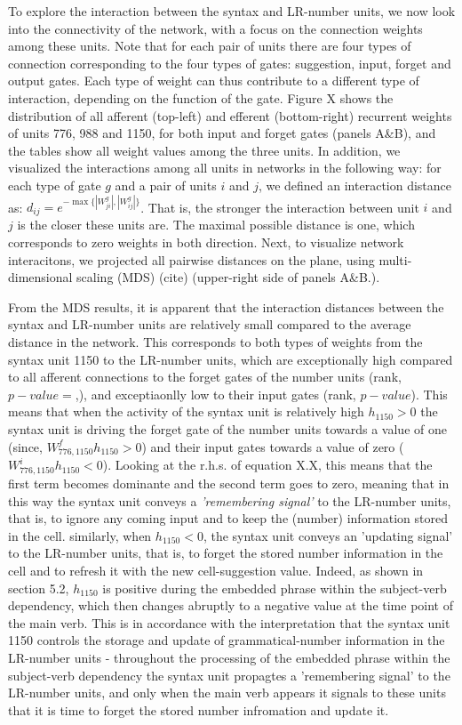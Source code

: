 To explore the interaction between the syntax and LR-number units, we now look into the connectivity of the network, with a focus on the connection weights among these units. Note that for each pair of units there are four types of connection corresponding to the four types of gates: suggestion, input, forget and output gates. Each type of weight can thus contribute to a different type of interaction, depending on the function of the gate. Figure X shows the distribution of all afferent (top-left) and efferent (bottom-right) recurrent weights of units 776, 988 and 1150, for both input and forget gates (panels A\&B), and the tables show all weight values among the three units. In addition, we visualized the interactions among all units in networks in the following way: for each type of gate $g$ and a pair of units $i$ and $j$, we defined an interaction distance as: $d_{ij}=e^{-\max{\{|W_{ji}^{g}|, |W_{ij}^{g}|\}}}$. That is, the stronger the interaction between unit $i$ and $j$ is the closer these units are. The maximal possible distance is one, which corresponds to zero weights in both direction. Next, to visualize network interacitons, we projected all pairwise distances on the plane, using multi-dimensional scaling (MDS) (cite) (upper-right side of panels A\&B.).

From the MDS results, it is apparent that the interaction distances between the syntax and LR-number units are relatively small compared to the average distance in the network. This corresponds to both types of weights from the syntax unit 1150 to the LR-number units, which are exceptionally high compared to all afferent connections to the forget gates of the number units (rank, $p-value=$,), and exceptiaonlly low to their input gates (rank, $p-value$). This means that when the activity of the syntax unit is relatively high $h_1150 > 0$ the syntax unit is driving the forget gate of the number units towards a value of one (since, $W^f_{776, 1150}h_1150>0$) and their input gates towards a value of zero ($W^i_{776, 1150}h_1150<0$). Looking at the r.h.s. of equation X.X, this means that the first term becomes dominante and the second term goes to zero, meaning that in this way the syntax unit conveys a \textit{'remembering signal'} to the LR-number units, that is, to ignore any coming input and to keep the (number) information stored in the cell. similarly, when $h_1150<0$, the syntax unit conveys an 'updating signal' to the LR-number units, that is, to forget the stored number information in the cell and to refresh it with the new cell-suggestion value. Indeed, as shown in section 5.2, $h_1150$ is positive during the embedded phrase within the subject-verb dependency, which then changes abruptly to a negative value at the time point of the main verb. This is in accordance with the interpretation that the syntax unit 1150 controls the storage and update of grammatical-number information in the LR-number units - throughout the processing of the embedded phrase within the subject-verb dependency the syntax unit propagtes a 'remembering signal' to the LR-number units, and only when the main verb appears it signals to these units that it is time to forget the stored number infromation and update it. 


